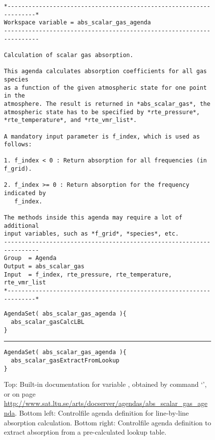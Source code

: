 \begin{figure}
\footnotesize
\begin{lstlisting}
*-------------------------------------------------------------------*
Workspace variable = abs_scalar_gas_agenda
---------------------------------------------------------------------

Calculation of scalar gas absorption.

This agenda calculates absorption coefficients for all gas species 
as a function of the given atmospheric state for one point in the 
atmosphere. The result is returned in *abs_scalar_gas*, the 
atmospheric state has to be specified by *rte_pressure*, 
*rte_temperature*, and *rte_vmr_list*.

A mandatory input parameter is f_index, which is used as follows:

1. f_index < 0 : Return absorption for all frequencies (in f_grid).

2. f_index >= 0 : Return absorption for the frequency indicated by
   f_index. 

The methods inside this agenda may require a lot of additional
input variables, such as *f_grid*, *species*, etc.
---------------------------------------------------------------------
Group  = Agenda
Output = abs_scalar_gas
Input  = f_index, rte_pressure, rte_temperature, rte_vmr_list
*-------------------------------------------------------------------*
\end{lstlisting}
\begin{minipage}[t]{0.48\hsize}
\begin{lstlisting}
AgendaSet( abs_scalar_gas_agenda ){
  abs_scalar_gasCalcLBL
}
\end{lstlisting}
\end{minipage}
\hspace*{\fill}
\rule[-40pt]{.5pt}{40pt}
\hspace*{\fill}
\begin{minipage}[t]{0.48\hsize}
\begin{lstlisting}
AgendaSet( abs_scalar_gas_agenda ){
  abs_scalar_gasExtractFromLookup
}
\end{lstlisting}
\end{minipage}
\caption{Top: Built-in documentation for variable
  , obtained by command
  `', or on page
  \url{http://www.sat.ltu.se/arts/docserver/agendas/abs_scalar_gas_agenda}. Bottom
  left: Controlfile agenda definition for line-by-line absorption
  calculation. Bottom right: Controlfile agenda definition to extract
  absorption from a pre-calculated lookup table.}
\label{fig:agendas}
\end{figure}

